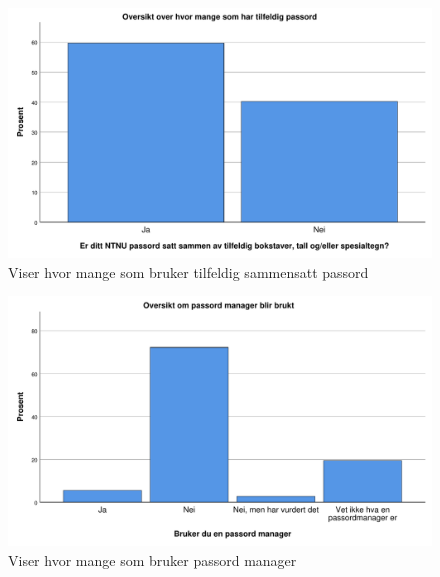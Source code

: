 \begin{figure}[H]
    \centering
    \includegraphics[scale=0.5]{case_2/bilder/spss/tilfeldig_passord.pdf}
    \caption[Hvor mange som bruker tilfeldig passord]{Viser hvor mange som bruker tilfeldig sammensatt passord}
    \label{fig:tilfeldig-passord}
\end{figure}

\begin{figure}[H]
    \centering
    \includegraphics[scale=0.5]{case_2/bilder/spss/pass_manager.pdf}
    \caption[Hvor mange som bruker passordmanager]{Viser hvor mange som bruker passord manager}
    \label{fig:passord-manager}
\end{figure}